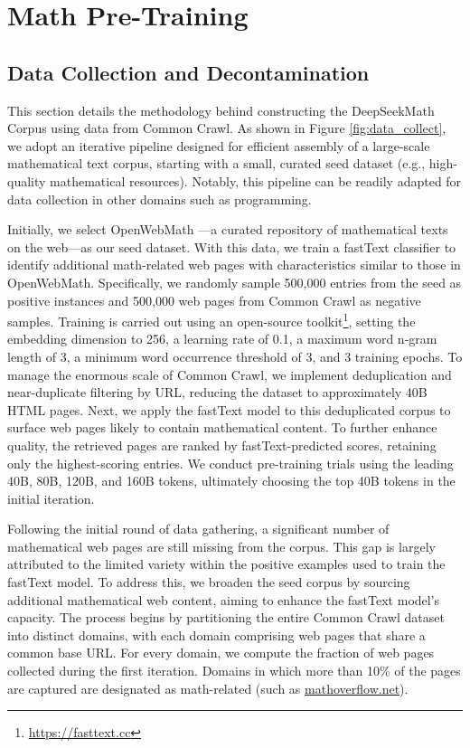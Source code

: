 \section{Math Pre-Training}

\subsection{Data Collection and Decontamination} This section details the methodology behind constructing the DeepSeekMath Corpus using data from Common Crawl. As shown in Figure \ref{fig:data_collect}, we adopt an iterative pipeline designed for efficient assembly of a large-scale mathematical text corpus, starting with a small, curated seed dataset (e.g., high-quality mathematical resources). Notably, this pipeline can be readily adapted for data collection in other domains such as programming.

Initially, we select OpenWebMath \citep{openwebmath}—a curated repository of mathematical texts on the web—as our seed dataset. With this data, we train a fastText classifier \citep{joulin2016fasttext} to identify additional math-related web pages with characteristics similar to those in OpenWebMath. Specifically, we randomly sample 500,000 entries from the seed as positive instances and 500,000 web pages from Common Crawl as negative samples. Training is carried out using an open-source toolkit\footnote{\url{https://fasttext.cc}}, setting the embedding dimension to 256, a learning rate of 0.1, a maximum word n-gram length of 3, a minimum word occurrence threshold of 3, and 3 training epochs. To manage the enormous scale of Common Crawl, we implement deduplication and near-duplicate filtering by URL, reducing the dataset to approximately 40B HTML pages. Next, we apply the fastText model to this deduplicated corpus to surface web pages likely to contain mathematical content. To further enhance quality, the retrieved pages are ranked by fastText-predicted scores, retaining only the highest-scoring entries. We conduct pre-training trials using the leading 40B, 80B, 120B, and 160B tokens, ultimately choosing the top 40B tokens in the initial iteration.

Following the initial round of data gathering, a significant number of mathematical web pages are still missing from the corpus. This gap is largely attributed to the limited variety within the positive examples used to train the fastText model. To address this, we broaden the seed corpus by sourcing additional mathematical web content, aiming to enhance the fastText model's capacity. The process begins by partitioning the entire Common Crawl dataset into distinct domains, with each domain comprising web pages that share a common base URL. For every domain, we compute the fraction of web pages collected during the first iteration. Domains in which more than 10\% of the pages are captured are designated as math-related (such as \url{mathoverflow.net}).

